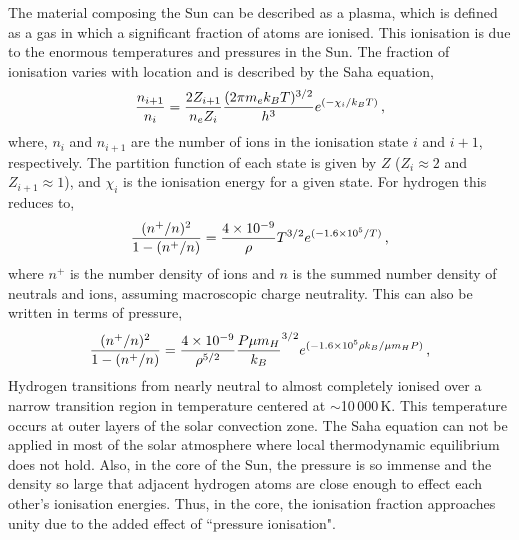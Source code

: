 The material composing the Sun can be described as a plasma, which is defined as a gas in which a significant fraction of atoms are ionised. This ionisation is due to the enormous temperatures and pressures in the Sun. The fraction of ionisation varies with location and is described by the Saha equation,
\begin{equation}
\frac{n_{i+1}}{n_i} = \frac{2 Z_{i+1}}{n_e Z_i} \frac{(2 \pi m_e k_B T)^{3/2}}{h^3} e^{( -\chi_i/k_B T)} \mbox{\,,}
\end{equation}
where, $n_{i}$ and $n_{i+1}$ are the number of ions in the ionisation state $i$ and $i+1$, respectively. The partition function of each state is given by $Z$ ($Z_{i} \approx 2$ and $Z_{i+1} \approx 1$), %
and $\chi_i$ is the ionisation energy for a given state.
For hydrogen this reduces to, 
\begin{equation}\label{eqn:saha}
\frac{(n^+/n)^2}{1-(n^+/n)}=\frac{4\times10^{-9}}{\rho} T^{3/2} e^{(-1.6 \times 10^5 / T)} \mbox{\,,}
\end{equation}
where $n^+$ is the number density of ions and $n$ is the summed number density of neutrals and ions, assuming macroscopic charge neutrality. This can also be written in terms of pressure,
\begin{equation}\label{eqn:sahap}
\frac{(n^+/n)^2}{1-(n^+/n)}=\frac{4\times10^{-9}}{\rho^{5/2}} {\frac{P\mu m_H}{k_B}}^{3/2} e^{(-1.6 \times 10^5 \rho k_B /\mu m_H P)} \mbox{\,,}
\end{equation}
Hydrogen transitions from nearly neutral to almost completely ionised over a narrow transition region in temperature centered at $\sim$10\,000\,K. This temperature occurs at outer layers of the solar convection zone. The Saha equation can not be applied in most of the solar atmosphere where local thermodynamic equilibrium does not hold. Also, in the core of the Sun, the pressure is so immense and the density so large that adjacent hydrogen atoms are close enough to effect each other's ionisation energies. Thus, in the core, the ionisation fraction approaches unity due to the added effect of ``pressure ionisation".

